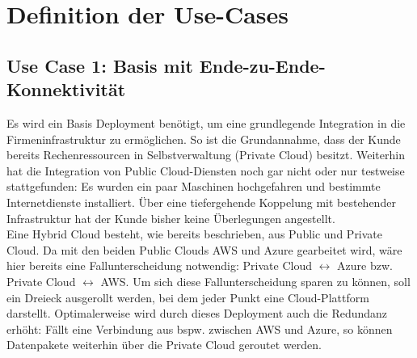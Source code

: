 \chapter{Definition der Use-Cases} \label{Defintion der Use-Cases}




\section{Use Case 1: Basis mit Ende-zu-Ende-Konnektivität}\label{base-deployment}

Es wird ein Basis \gls{Deployment} benötigt, um eine grundlegende Integration in die Firmeninfrastruktur zu ermöglichen. So ist die Grundannahme, dass der Kunde bereits Rechenressourcen in Selbstverwaltung (\glqq Private Cloud\grqq{}) besitzt. Weiterhin hat die Integration von Public Cloud-Diensten noch gar nicht oder nur testweise stattgefunden: Es wurden ein paar Maschinen hochgefahren und bestimmte Internetdienste installiert. Über eine tiefergehende Koppelung mit bestehender Infrastruktur hat der Kunde bisher keine Überlegungen angestellt.\\
Eine Hybrid Cloud besteht, wie bereits beschrieben, aus Public und Private Cloud. Da mit den beiden Public Clouds AWS und Azure gearbeitet wird, wäre hier bereits eine Fallunterscheidung notwendig: Private Cloud $\leftrightarrow$ Azure bzw. Private Cloud $\leftrightarrow$ AWS. Um sich diese Fallunterscheidung sparen zu können, soll ein Dreieck ausgerollt werden, bei dem jeder Punkt eine Cloud-Plattform darstellt.
Optimalerweise wird durch dieses \gls{Deployment} auch die Redundanz erhöht: Fällt eine Verbindung aus bspw. zwischen AWS und Azure, so können Datenpakete weiterhin über die Private Cloud geroutet werden.

